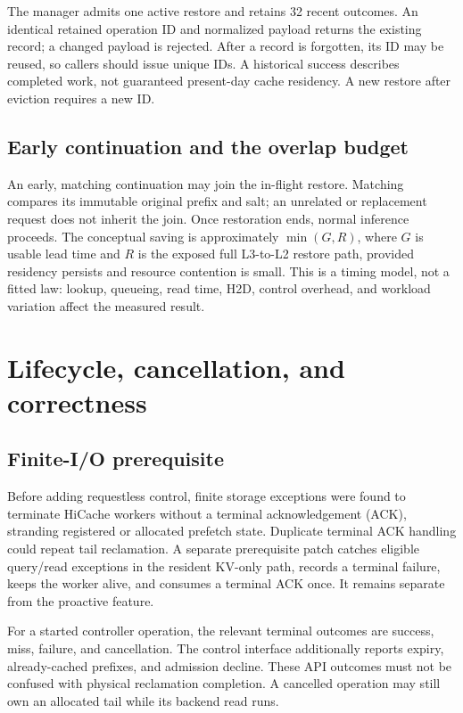 \documentclass[10pt,a4paper]{article}
\newcommand{\pagemark}{\newpage}
\begin{document}
The manager admits one active restore and retains 32 recent outcomes. An identical retained operation ID and normalized payload returns the existing record; a changed payload is rejected. After a record is forgotten, its ID may be reused, so callers should issue unique IDs. A historical success describes completed work, not guaranteed present-day cache residency. A new restore after eviction requires a new ID.

\subsection{Early continuation and the overlap budget}
An early, matching continuation may join the in-flight restore. Matching compares its immutable original prefix and salt; an unrelated or replacement request does not inherit the join. Once restoration ends, normal inference proceeds. The conceptual saving is approximately $\min(G,R)$, where $G$ is usable lead time and $R$ is the exposed full L3-to-L2 restore path, provided residency persists and resource contention is small. This is a timing model, not a fitted law: lookup, queueing, read time, H2D, control overhead, and workload variation affect the measured result.

\pagemark
\section{Lifecycle, cancellation, and correctness}
\subsection{Finite-I/O prerequisite}
Before adding requestless control, finite storage exceptions were found to terminate HiCache workers without a terminal acknowledgement (ACK), stranding registered or allocated prefetch state. Duplicate terminal ACK handling could repeat tail reclamation. A separate prerequisite patch catches eligible query/read exceptions in the resident KV-only path, records a terminal failure, keeps the worker alive, and consumes a terminal ACK once. It remains separate from the proactive feature.

For a started controller operation, the relevant terminal outcomes are success, miss, failure, and cancellation. The control interface additionally reports expiry, already-cached prefixes, and admission decline. These API outcomes must not be confused with physical reclamation completion. A cancelled operation may still own an allocated tail while its backend read runs.
\end{document}
